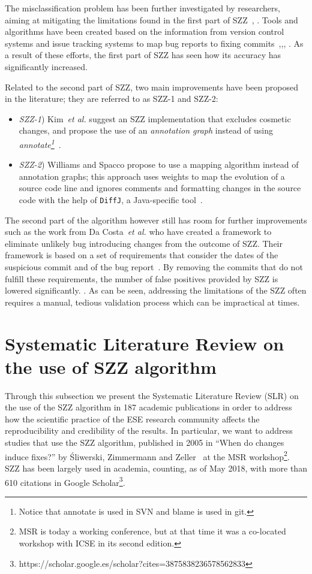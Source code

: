 \documentclass[a4paper, 12pt]{book}
\begin{document}
The misclassification problem has been further investigated by researchers, aiming at mitigating the limitations found in the first part of SZZ~\cite{herzig2013s}, \cite{tan2015online} \cite{rodriguez2016bugtracking}. Tools and algorithms have been created based on the information from version control systems and issue tracking systems to map bug reports to fixing commits~\cite{wu2011relink},\cite{nguyen2012multi},\cite{le2015rclinker}, \cite{sun2017frlink}. As a result of these efforts, the first part of SZZ has seen how its accuracy has significantly increased. 

Related to the second part of SZZ, two main improvements have been proposed in the literature; they are referred to as SZZ-1 and SZZ-2:
\begin{itemize}
	\item \emph{SZZ-1}) Kim~\textit{et al.} suggest an SZZ implementation that excludes cosmetic changes, and propose the use of an \textit{annotation graph} instead of using \textit{annotate\footnote{Notice that annotate is used in SVN and blame is used in git.}}~\cite{kim2006automatic}.
	\item \emph{SZZ-2}) Williams and Spacco propose to use a mapping algorithm instead of annotation graphs; this approach uses weights to map the evolution of a source code line and ignores comments and formatting changes in the source code with the help of \texttt{DiffJ}, a Java-specific tool~\cite{williams2008szz}.
\end{itemize}

The second part of the algorithm however still has room for further improvements such as the work from Da Costa~\textit{et al.} who have created a framework to eliminate unlikely bug introducing changes from the outcome of SZZ. Their framework is based on a set of requirements that consider the dates of the suspicious commit and of the bug report~\cite{da2016framework}. By removing the commits that do not fulfill these requirements, the number of false positives provided by SZZ is lowered significantly.
. As can be seen, addressing the limitations of the SZZ often requires a manual, tedious validation process which can be impractical at times.

\section{Systematic Literature Review on the use of SZZ algorithm}
\label{subsec:SLR}

Through this subsection we present the Systematic Literature Review (SLR) on the use of the SZZ algorithm in 187 academic publications in order to address how the scientific practice of the ESE research community affects the reproducibility and credibility of the results. In particular, we want to address studies that use the SZZ algorithm, published in 2005 in ``When do changes induce fixes?'' by {\'S}liwerski, Zimmermann and Zeller~\cite{sliwerski2005changes} at the MSR workshop\footnote{MSR is today a working conference, but at that time it was a co-located workshop with ICSE in its second edition.}.  SZZ has been largely used in academia, counting, as of May 2018, with more than 610 citations in Google Scholar\footnote{https://scholar.google.es/scholar?cites=3875838236578562833}.
\end{document}
